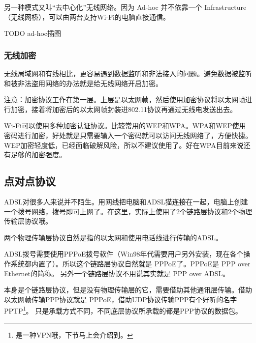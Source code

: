 



另一种模式又叫“去中心化”无线网络。因为 Ad-hoc 并不依靠一个 Infrastructure（无线网桥），可以由两台支持Wi-Fi的电脑直接通信。

TODO ad-hoc插图 %


\subsubsection{无线加密}

无线局域网和有线相比，更容易遇到数据监听和非法接入的问题。避免数据被监听和被非法盗用网络的办法就是给无线网络开启加密。

\begin{notice}
注意：加密协议工作在第一层。上层是以太网帧，然后使用加密协议将以太网帧进行加密，接着将加密后的以太网帧封装进802.11协议再通过无线电发送出去。
\end{notice}

Wi-Fi可以使用多种加密认证协议。比较常用的WEP和WPA。WPA和WEP使用密码进行加密，好处就是只需要输入一个密码就可以访问无线网络了，方便快捷。
WEP加密轻度低，已经面临破解风险，所以不建议使用了。好在WPA目前来说还有足够的加密强度。

\subsection{点对点协议}

ADSL对很多人来说并不陌生。用网线把电脑和ADSL猫连接在一起，电脑上创建一个拨号网络，拨号即可上网了。在这里，实际上使用了2个链路层协议和2个物理传输层协议哦。

两个物理传输层协议自然是指的以太网和使用电话线进行传输的ADSL。

ADSL拨号需要使用PPPoE拨号软件（Win98年代需要用户另外安装，现在各个操作系统都内置了）。所以这个链路层协议自然就是 PPPoE了。PPPoE是 PPP over Ethernet的简称。
另外一个链路层协议不用说其实就是 PPP over ADSL。

本身是个链路层协议，但是没有物理传输层的它，需要借助其他通讯层传输。借助以太网帧传输PPP协议就是 PPPoE，借助UDP协议传输PPP有个好听的名字PPTP\footnote{是一种VPN哦，下节马上会介绍到。}。 只是承载方式不同，不同底层协议所承载的都是PPP协议的数据包。


